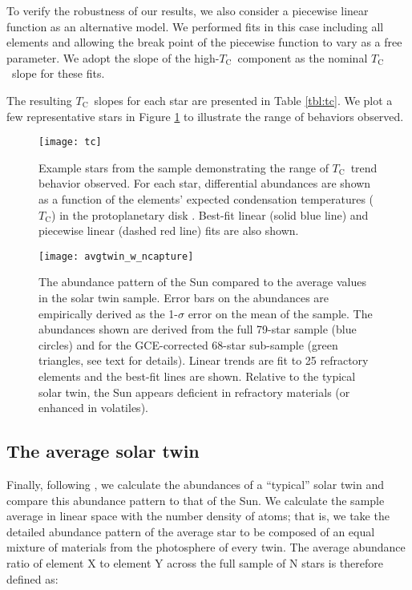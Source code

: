 \documentclass[twocolumn, trackchanges]{aastex62}
\newcommand{\tc}{$T_\mathrm{C}$}
\newcommand{\acronym}[1]{{\small{#1}}}
\begin{document}
To verify the robustness of our results, we also consider a piecewise linear function as an alternative model. We performed fits in this case including all elements and allowing the break point of the piecewise function to vary as a free parameter. We adopt the slope of the high-\tc\ component as the nominal \tc\ slope for these fits. 

The resulting \tc\ slopes for each star are presented in Table \ref{tbl:tc}. We plot a few representative stars in Figure \ref{fig:tc} to illustrate the range of behaviors observed.

\begin{figure}
\centering
\texttt{[image: tc]}
\caption{Example stars from the sample demonstrating the range of \tc\ trend behavior observed. For each star, differential abundances are shown as a function of the elements' expected condensation temperatures (\tc) in the protoplanetary disk \citep{lodders03}. Best-fit linear (solid blue line) and piecewise linear (dashed red line) fits are also shown.}
\label{fig:tc}
\end{figure}

\begin{figure*}
\centering
\texttt{[image: avgtwin\_w\_ncapture]}
\caption{The abundance pattern of the Sun compared to the average values in the solar twin sample. Error bars on the abundances are empirically derived as the 1-$\sigma$ error on the mean of the sample. The abundances shown are derived from the full 79-star sample (blue circles) and for the \acronym{GCE}-corrected 68-star sub-sample (green triangles, see text for details). Linear trends are fit to 25 refractory elements and the best-fit lines are shown. Relative to the typical solar twin, the Sun appears deficient in refractory materials (or enhanced in volatiles).}
\label{fig:avgtwin}
\end{figure*}

\subsection{The average solar twin}

Finally, following \citet{melendez09}, we calculate the abundances of a ``typical'' solar twin and compare this abundance pattern to that of the Sun. We calculate the sample average in linear space with the number density of atoms; that is, we take the detailed abundance pattern of the average star to be composed of an equal mixture of materials from the photosphere of every twin. The average abundance ratio of element X to element Y across the full sample of N stars is therefore defined as:
\end{document}

